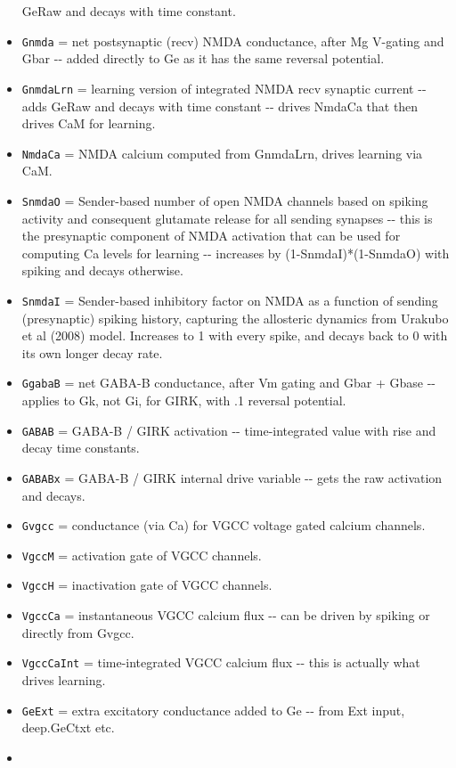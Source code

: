 \documentclass[11pt,twoside]{article}
\newif\myifpdf
\begin{document}
\begin{itemize}
  GeRaw and decays with time constant.
\item
  \texttt{Gnmda} = net postsynaptic (recv) NMDA conductance, after Mg
  V-gating and Gbar -\/- added directly to Ge as it has the same
  reversal potential.
\item
  \texttt{GnmdaLrn} = learning version of integrated NMDA recv synaptic
  current -\/- adds GeRaw and decays with time constant -\/- drives
  NmdaCa that then drives CaM for learning.
\item
  \texttt{NmdaCa} = NMDA calcium computed from GnmdaLrn, drives learning
  via CaM.
\item
  \texttt{SnmdaO} = Sender-based number of open NMDA channels based on
  spiking activity and consequent glutamate release for all sending
  synapses -\/- this is the presynaptic component of NMDA activation
  that can be used for computing Ca levels for learning -\/- increases
  by (1-SnmdaI)*(1-SnmdaO) with spiking and decays otherwise.
\item
  \texttt{SnmdaI} = Sender-based inhibitory factor on NMDA as a function
  of sending (presynaptic) spiking history, capturing the allosteric
  dynamics from Urakubo et al (2008) model. Increases to 1 with every
  spike, and decays back to 0 with its own longer decay rate.
\item
  \texttt{GgabaB} = net GABA-B conductance, after Vm gating and Gbar +
  Gbase -\/- applies to Gk, not Gi, for GIRK, with .1 reversal
  potential.
\item
  \texttt{GABAB} = GABA-B / GIRK activation -\/- time-integrated value
  with rise and decay time constants.
\item
  \texttt{GABABx} = GABA-B / GIRK internal drive variable -\/- gets the
  raw activation and decays.
\item
  \texttt{Gvgcc} = conductance (via Ca) for VGCC voltage gated calcium
  channels.
\item
  \texttt{VgccM} = activation gate of VGCC channels.
\item
  \texttt{VgccH} = inactivation gate of VGCC channels.
\item
  \texttt{VgccCa} = instantaneous VGCC calcium flux -\/- can be driven
  by spiking or directly from Gvgcc.
\item
  \texttt{VgccCaInt} = time-integrated VGCC calcium flux -\/- this is
  actually what drives learning.
\item
  \texttt{GeExt} = extra excitatory conductance added to Ge -\/- from
  Ext input, deep.GeCtxt etc.
\item

\end{itemize}
\end{document}
